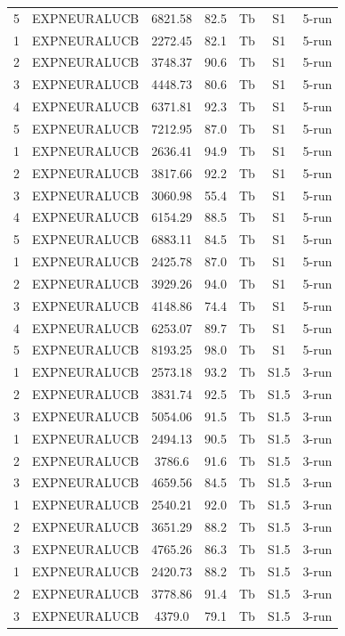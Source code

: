 \documentclass[11pt]{article}
\begin{document}
\begin{center}
\begin{longtable}{|c|c|c|c|c|c|c|}
5 & EXPNEURALUCB & 6821.58 & 82.5 & Tb & S1 & 5-run \\
1 & EXPNEURALUCB & 2272.45 & 82.1 & Tb & S1 & 5-run \\
2 & EXPNEURALUCB & 3748.37 & 90.6 & Tb & S1 & 5-run \\
3 & EXPNEURALUCB & 4448.73 & 80.6 & Tb & S1 & 5-run \\
4 & EXPNEURALUCB & 6371.81 & 92.3 & Tb & S1 & 5-run \\
5 & EXPNEURALUCB & 7212.95 & 87.0 & Tb & S1 & 5-run \\
1 & EXPNEURALUCB & 2636.41 & 94.9 & Tb & S1 & 5-run \\
2 & EXPNEURALUCB & 3817.66 & 92.2 & Tb & S1 & 5-run \\
3 & EXPNEURALUCB & 3060.98 & 55.4 & Tb & S1 & 5-run \\
4 & EXPNEURALUCB & 6154.29 & 88.5 & Tb & S1 & 5-run \\
5 & EXPNEURALUCB & 6883.11 & 84.5 & Tb & S1 & 5-run \\
1 & EXPNEURALUCB & 2425.78 & 87.0 & Tb & S1 & 5-run \\
2 & EXPNEURALUCB & 3929.26 & 94.0 & Tb & S1 & 5-run \\
3 & EXPNEURALUCB & 4148.86 & 74.4 & Tb & S1 & 5-run \\
4 & EXPNEURALUCB & 6253.07 & 89.7 & Tb & S1 & 5-run \\
5 & EXPNEURALUCB & 8193.25 & 98.0 & Tb & S1 & 5-run \\
1 & EXPNEURALUCB & 2573.18 & 93.2 & Tb & S1.5 & 3-run \\
2 & EXPNEURALUCB & 3831.74 & 92.5 & Tb & S1.5 & 3-run \\
3 & EXPNEURALUCB & 5054.06 & 91.5 & Tb & S1.5 & 3-run \\
1 & EXPNEURALUCB & 2494.13 & 90.5 & Tb & S1.5 & 3-run \\
2 & EXPNEURALUCB & 3786.6 & 91.6 & Tb & S1.5 & 3-run \\
3 & EXPNEURALUCB & 4659.56 & 84.5 & Tb & S1.5 & 3-run \\
1 & EXPNEURALUCB & 2540.21 & 92.0 & Tb & S1.5 & 3-run \\
2 & EXPNEURALUCB & 3651.29 & 88.2 & Tb & S1.5 & 3-run \\
3 & EXPNEURALUCB & 4765.26 & 86.3 & Tb & S1.5 & 3-run \\
1 & EXPNEURALUCB & 2420.73 & 88.2 & Tb & S1.5 & 3-run \\
2 & EXPNEURALUCB & 3778.86 & 91.4 & Tb & S1.5 & 3-run \\
3 & EXPNEURALUCB & 4379.0 & 79.1 & Tb & S1.5 & 3-run \\

\end{longtable}
\end{center}
\end{document}
